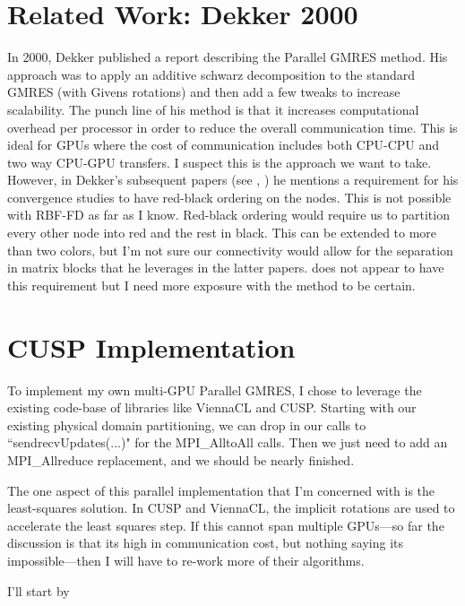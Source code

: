 \section{Related Work: Dekker 2000}
In 2000, Dekker \cite{Dekker2000} published a report describing the Parallel GMRES method. His approach was to apply an additive schwarz decomposition to the standard GMRES (with Givens rotations) and then add a few tweaks to increase scalability. The punch line of his method is that it increases computational overhead per processor in order to reduce the overall communication time. This is ideal for GPUs where the cost of communication includes both CPU-CPU and two way CPU-GPU transfers. I suspect this is the approach we want to take. However, in Dekker's subsequent papers (see \cite{Dekker2001}, \cite{Dekker2005}) he mentions a requirement for his convergence studies to have red-black ordering on the nodes. This is not possible with RBF-FD as far as I know. Red-black ordering would require us to partition every other node into red and the rest in black. This can be extended to more than two colors, but I'm not sure our connectivity would allow for the separation in matrix blocks that he leverages in the latter papers. \cite{Dekker2000} does not appear to have this requirement but I need more exposure with the method to be certain.  


\section{CUSP Implementation} 

To implement my own multi-GPU Parallel GMRES, I chose to leverage the existing code-base of libraries like ViennaCL and CUSP. Starting with our existing physical domain partitioning, we can drop in our calls to ``sendrecvUpdates(...)" for the MPI\_AlltoAll calls. Then we just need to add an MPI\_Allreduce replacement, and we should be nearly finished. 

The one aspect of this parallel implementation that I'm concerned with is the least-squares solution. In CUSP and ViennaCL, the implicit rotations are used to accelerate the least squares step. If this cannot span multiple GPUs---so far the discussion is that its high in communication cost, but nothing saying its impossible---then I will have to re-work more of their algorithms. 

I'll start by 

